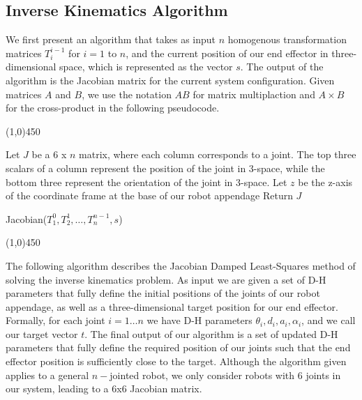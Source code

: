 \subsection{Inverse Kinematics Algorithm}
We first present an algorithm that takes as input $n$ homogenous transformation matrices $T^{i-1}_i$ for $i=1$ to $n$, and
the current position of our end effector in three-dimensional space, which is represented as the vector $s$. 
The output of the algorithm is the Jacobian matrix for the current system configuration. Given matrices $A$ and $B$, we use the notation
$AB$ for matrix multiplaction and $A \times B$ for the cross-product in the following pseudocode.\\

\begin{center}
\line(1,0){450}
\end{center}
\begin{algorithm}[H]
\DontPrintSemicolon
Let $J$ be a 6 x $n$ matrix, where each column corresponds to a joint. The top three scalars of a column represent the
position of the joint in 3-space, while the bottom three represent the orientation of the joint in 3-space.\;
Let $z$ be the z-axis of the coordinate frame at the base of our robot appendage\;
Return $J$
\caption{Jacobian($T^0_1, T^1_2, \ldots, T^{n-1}_n, s$)\label{IR}}
\begin{center}
\noindent\line(1,0){450}
\end{center}
\end{algorithm}
\vspace{2mm}

The following algorithm describes the Jacobian Damped Least-Squares method of solving the inverse kinematics problem. 
As input we are given a set of D-H parameters that fully define
the initial positions of the joints of our robot appendage, as well as a three-dimensional target position for our end effector. 
Formally, for each joint $i = 1 \ldots n$ we have D-H parameters $\theta_i, d_i, a_i, \alpha_i$, and
we call our target vector $t$. The final output of our algorithm is a set of updated D-H parameters that fully define
the required position of our joints such that the end effector position is sufficiently close to the target.
Although the algorithm given applies to a general $n-$jointed robot, we only consider robots with 6 joints in our system, leading
to a 6x6 Jacobian matrix.


